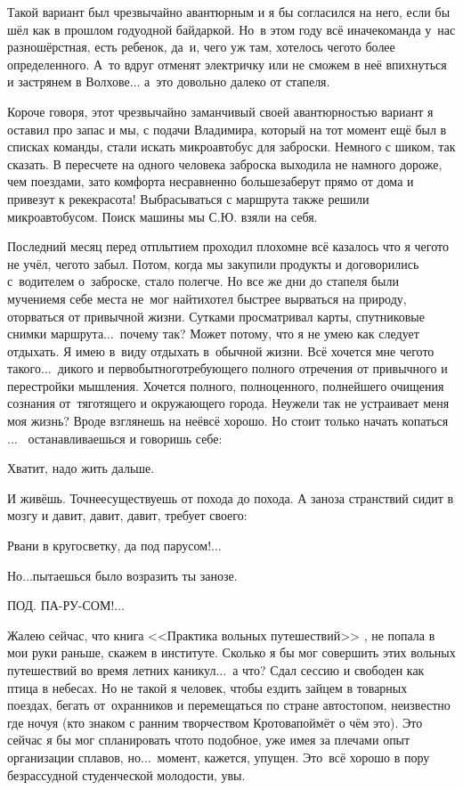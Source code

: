 Такой вариант был чрезвычайно авантюрным и я бы согласился на него, если бы шёл как в прошлом году\mdash одной байдаркой. Но~в этом году всё иначе\mdash команда у~нас разношёрстная, есть ребенок, да~и, чего уж там, хотелось чего\sdash то более определенного. А~то вдруг отменят электричку или не сможем в неё впихнуться и застрянем в Волхове$\ldots$ а~это довольно далеко от стапеля.
 
Короче говоря, этот чрезвычайно заманчивый своей авантюрностью вариант я оставил про запас и мы, с подачи Владимира, который на тот момент ещё был в списках команды, стали искать микроавтобус для заброски. Немного с шиком, так сказать. В пересчете на одного человека заброска выходила не намного дороже, чем поездами, зато комфорта несравненно больше\mdash заберут прямо от дома и привезут к реке\mdash  красота! Выбрасываться с маршрута также решили микроавтобусом. Поиск машины мы С.Ю. взяли на себя.

Последний месяц перед отплытием проходил плохо\mdash мне всё казалось что я чего\sdash то не учёл, чего\sdash то забыл. Потом, когда мы закупили продукты и договорились с~водителем о~заброске, стало полегче. Но все же дни до стапеля были мучением\mdash я себе места не~мог найти\mdash хотел быстрее вырваться на природу, оторваться от привычной жизни. Сутками просматривал карты, спутниковые снимки маршрута$\ldots$~почему так? Может потому, что я не умею как следует отдыхать. Я имею в~виду отдыхать в~обычной жизни. Всё хочется мне чего\sdash то такого$\ldots$~дикого и первобытного\mdash  требующего полного отречения от привычного и перестройки мышления. Хочется полного, полноценного, полнейшего очищения сознания от~тяготящего и окружающего города. Неужели так не устраивает меня моя жизнь? Вроде взглянешь на неё\mdash всё хорошо. Но стоит только начать копаться$\ldots$~ останавливаешься и говоришь себе: 

\diagdash Хватит, надо жить дальше. 

И живёшь. Точнее\mdash существуешь от похода до похода. А заноза странствий сидит в мозгу и давит, давит, давит, требует своего:

\diagdash Рвани в кругосветку, да под парусом!$\ldots$

\diagdash Но$\ldots$\mdash пытаешься было возразить ты занозе.

\diagdash ПОД. ПА-РУ-СОМ!$\ldots$

Жалею сейчас, что книга <<Практика вольных путешествий>> \cite{Кротов}, не попала в мои руки раньше, скажем в институте. Сколько я бы мог совершить этих вольных путешествий во время летних каникул$\ldots$~а что? Сдал сессию и свободен как птица в небесах. Но не такой я человек, чтобы ездить зайцем в товарных поездах, бегать от~охранников и перемещаться по стране автостопом, неизвестно где ночуя (кто знаком с ранним творчеством Кротова\mdash поймёт о чём это). Это сейчас я бы мог спланировать что\sdash то подобное, уже имея за плечами опыт организации сплавов, но$\ldots$~момент, кажется, упущен. Это~всё хорошо в пору безрассудной студенческой молодости, увы.

